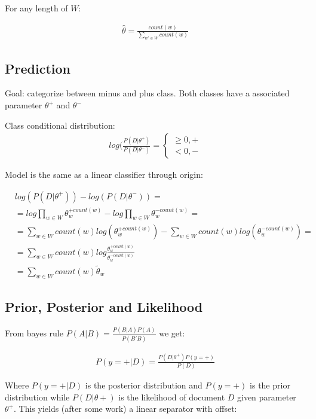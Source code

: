 For any length of $W$:

\begin{align*}
\hat{\theta}=\frac{count(w)}{\sum_{w'\in W}count(w)}
\end{align*}

\subsection{Prediction}

Goal: categorize between minus and plus class. Both classes have a associated parameter $\theta^{+}$ and $\theta^{-}$ 

Class conditional distribution:\\

\begin{align*}
log(\frac{P(D|\theta^{+})}{P(D|\theta^{-})} = 
\begin{cases} 
\geq 0, +\\
< 0, -
\end{cases}
\end{align*}

Model is the same as a linear classifier through origin:

\begin{align*}
&log(P(D|\theta^{+})) - log(P(D|\theta^{-})) =\\
&= log \prod_{w \in W} \theta_w^{+count(w)} - log \prod_{w \in W} \theta_w^{-count(w)} =\\
&= \sum_{w \in W} count(w) log(\theta_w^{+count(w)}) - \sum_{w \in W} count(w) log(\theta_w^{-count(w)}) =\\
&=\sum_{w \in W} count(w) log \frac{\theta_w^{+count(w)}}{\theta_w^{-count(w)}}\\
&= \sum_{w \in W} count(w) \tilde{\theta}_w
\end{align*}

\subsection{Prior, Posterior and Likelihood}

From bayes rule $P(A|B) = \frac{P(B|A)P(A)}{P(B'B)}$ we get:

\begin{align*}
P(y=+ | D) = \frac{ P(D | \theta ^{+})P(y = +)}{P(D)}
\end{align*}

Where $P(y=+|D)$ is the posterior distribution and $P(y=+)$ is the prior distribution while $P(D|\theta+)$ is the likelihood of document $D$ given parameter  $\theta^{+}$. This yields (after some work) a linear separator with offset:


